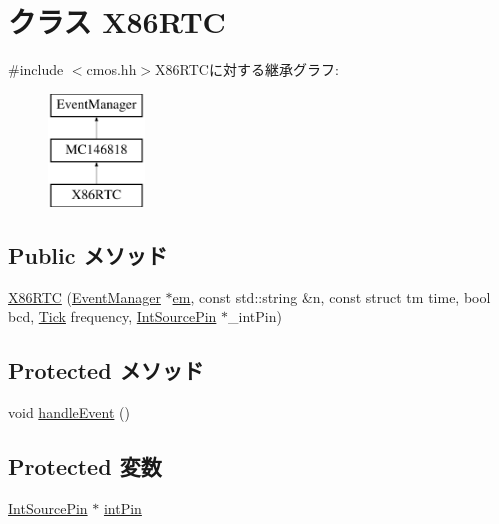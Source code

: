 \hypertarget{classX86ISA_1_1Cmos_1_1X86RTC}{
\section{クラス X86RTC}
\label{classX86ISA_1_1Cmos_1_1X86RTC}
}


{\ttfamily \#include $<$cmos.hh$>$}X86RTCに対する継承グラフ:\begin{figure}[H]
\begin{center}
\leavevmode
\includegraphics[height=3cm]{classX86ISA_1_1Cmos_1_1X86RTC}
\end{center}
\end{figure}
\subsection*{Public メソッド}
\begin{DoxyCompactItemize}
\item 
\hyperlink{classX86ISA_1_1Cmos_1_1X86RTC_ad1453b48e64ab00d27a425cdfa58918e}{X86RTC} (\hyperlink{classEventManager}{EventManager} $\ast$\hyperlink{namespaceX86ISA_acee3b5ece28581fdc0421d3ba9075206}{em}, const std::string \&n, const struct tm time, bool bcd, \hyperlink{base_2types_8hh_a5c8ed81b7d238c9083e1037ba6d61643}{Tick} frequency, \hyperlink{classX86ISA_1_1IntSourcePin}{IntSourcePin} $\ast$\_\-intPin)
\end{DoxyCompactItemize}
\subsection*{Protected メソッド}
\begin{DoxyCompactItemize}
\item 
void \hyperlink{classX86ISA_1_1Cmos_1_1X86RTC_af592dd6aaf1c9c6af780a5cbc531417e}{handleEvent} ()
\end{DoxyCompactItemize}
\subsection*{Protected 変数}
\begin{DoxyCompactItemize}
\item 
\hyperlink{classX86ISA_1_1IntSourcePin}{IntSourcePin} $\ast$ \hyperlink{classX86ISA_1_1Cmos_1_1X86RTC_abc04d372f6b8e69a72f4c25db91ede99}{intPin}
\end{DoxyCompactItemize}


